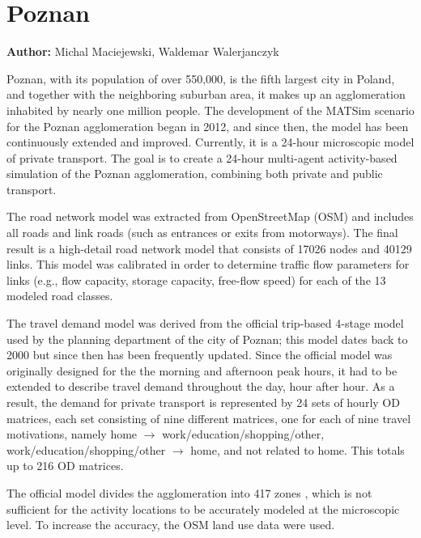 \section{Poznan}
\label{sec:poznan}
\hfill \textbf{Author:} Michal Maciejewski, Waldemar Walerjanczyk


Poznan, with its population of over 550,000, is the fifth largest city in Poland, and together with the neighboring suburban area, it makes up an agglomeration inhabited by nearly one million people. The development of the MATSim scenario for the Poznan agglomeration began in 2012, and since then, the model has been continuously extended and improved. Currently, it is a 24-hour microscopic model of private transport. The goal is to create a 24-hour multi-agent activity-based simulation of the Poznan agglomeration, combining both private and public transport.

The road network model was extracted from OpenStreetMap (OSM) and includes all roads and link roads (such as entrances or exits from motorways). The final result is a high-detail road network model that consists of 17026 nodes and 40129 links. This model was calibrated in order to determine traffic flow parameters for links (e.g., flow capacity, storage capacity, free-flow speed) for each of the 13 modeled road classes. 

The travel demand model was derived from the official trip-based 4-stage model used by the planning department of the city of Poznan; this model dates back to 2000 but since then has been frequently updated. Since the official model was originally designed for the the morning and afternoon peak hours, it had to be extended to describe travel demand throughout the day, hour after hour. As a result, the demand for private transport is represented by 24 sets of hourly OD matrices, each set consisting of nine different matrices, one for each of nine travel motivations, namely home $\rightarrow$ work/education/shopping/other, work/education/shopping/other $\rightarrow$ home, and not related to home. This totals up to 216 OD matrices. 

The official model divides the agglomeration into 417 zones , which is not sufficient for the activity locations to be accurately modeled at the microscopic level. To increase the accuracy, the OSM land use data were used.

